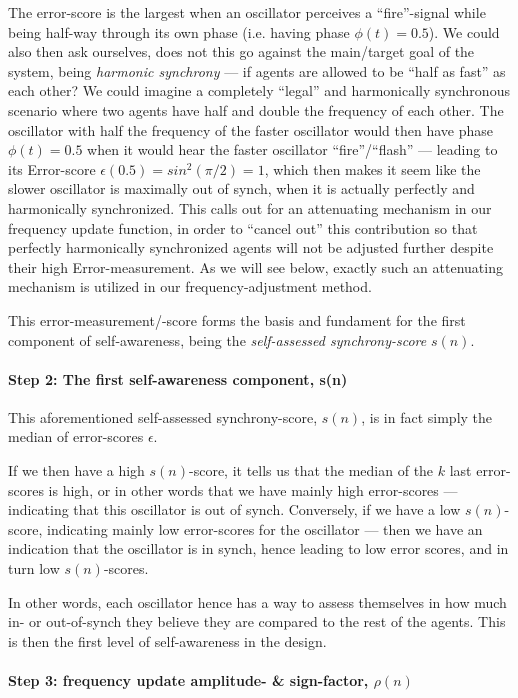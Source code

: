 		The error-score is the largest when an oscillator perceives a ``fire''-signal while being half-way through its own phase (i.e. having phase $\phi(t)=0.5$). We could also then ask ourselves, does not this go against the main/target goal of the system, being \textit{harmonic synchrony} — if agents are allowed to be ``half as fast'' as each other? We could imagine a completely ``legal'' and harmonically synchronous scenario where two agents have half and double the frequency of each other. The oscillator with half the frequency of the faster oscillator would then have phase $\phi(t)=0.5$ when it would hear the faster oscillator ``fire''/``flash'' — leading to its Error-score $\epsilon(0.5) = sin^2(\pi/2) = 1$, which then makes it seem like the slower oscillator is maximally out of synch, when it is actually perfectly and harmonically synchronized. This calls out for an attenuating mechanism in our frequency update function, in order to ``cancel out'' this contribution so that perfectly harmonically synchronized agents will not be adjusted further despite their high Error-measurement. As we will see below, exactly such an attenuating mechanism is utilized in our frequency-adjustment method.

		This error-measurement/-score forms the basis and fundament for the first component of self-awareness, being the \textit{self-assessed synchrony-score} $s(n)$.


		\paragraph{Step 2: The first self-awareness component, s(n)}
		\label{s_n}
		This aforementioned self-assessed synchrony-score, $s(n)$, is in fact simply the median of error-scores $\epsilon$.

		If we then have a high $s(n)$-score, it tells us that the median of the $k$ last error-scores is high, or in other words that we have mainly high error-scores — indicating that this oscillator is out of synch. Conversely, if we have a low $s(n)$-score, indicating mainly low error-scores for the oscillator — then we have an indication that the oscillator is in synch, hence leading to low error scores, and in turn low $s(n)$-scores. 

		In other words, each oscillator hence has a way to assess themselves in how much in- or out-of-synch they believe they are compared to the rest of the agents. This is then the first level of self-awareness in the design.

		\paragraph{Step 3: frequency update amplitude- \& sign-factor, $\rho(n)$}

